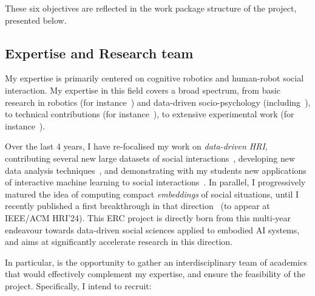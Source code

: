 These six objectives are reflected in the work package structure of the project,
presented below.




\subsection{Expertise and Research team}
\label{research-team}

My expertise is primarily centered on cognitive robotics and human-robot social
interaction. My expertise in this field covers a broad spectrum, from basic
research in robotics (for
instance~\cite{lemaignan2014dynamics,lemaignan2015mutual}) and data-driven
socio-psychology
(including~\cite{lemaignan2014cognitive,irfan2018social,winkle2019effective,bartlett2019what}),
to technical contributions (for instance~\cite{lemaignan2010oro,
lemaignan2017artificial, lemaignan2018underworlds}), to extensive experimental
work (for instance~\cite{hood2015cowriter,winkle2020couch,
lemaignan2022social}).

Over the last 4 years, I have re-focalised my work on \emph{data-driven HRI},
contributing several new large datasets of social
interactions~\cite{lemaignan2018pinsoro,sallami2020unexpected,webb2023sogrin},
developing new data analysis
techniques~\cite{bartlett2019what,webb2022measuring}, and demonstrating with my
students new applications of interactive machine learning to social
interactions~\cite{senft2016sparc,winkle2020couch,winkle2021leador}.  In
parallel, I progressively matured the idea of computing compact
\emph{embeddings} of social situations, until I recently published a first
breakthrough in that direction~\cite{lemaignan2024social} (to appear at IEEE/ACM
HRI'24). This ERC project is directly born from this multi-year endeavour
towards data-driven social sciences applied to embodied AI systems, and aims at
significantly accelerate research in this direction.

In particular, \project is the opportunity to gather an interdisciplinary team
of academics that would effectively complement my expertise, and ensure the
feasibility of the project. Specifically, I intend to recruit:

